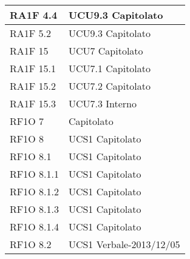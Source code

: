 \begin{center}
\begin{longtable}{ | p{5cm} | p{5cm} |}
        RA1F 4.4 &  UCU9.3 \newline  Capitolato \newline  \\ \hline      
        RA1F 5.2 &  UCU9.3 \newline  Capitolato \newline  \\ \hline      
        RA1F 15 &  UCU7 \newline  Capitolato \newline  \\ \hline      
        RA1F 15.1 &  UCU7.1 \newline  Capitolato \newline  \\ \hline      
        RA1F 15.2 &  UCU7.2 \newline  Capitolato \newline  \\ \hline      
        RA1F 15.3 &  UCU7.3 \newline  Interno \newline  \\ \hline      
        RF1O 7 &  Capitolato \newline  \\ \hline      
        RF1O 8  &  UCS1 \newline  Capitolato \newline  \\ \hline      
        RF1O 8.1  &  UCS1 \newline  Capitolato \newline  \\ \hline      
        RF1O 8.1.1  &  UCS1 \newline  Capitolato \newline  \\ \hline      
        RF1O 8.1.2 &  UCS1 \newline  Capitolato \newline  \\ \hline      
        RF1O 8.1.3  &  UCS1 \newline  Capitolato \newline  \\ \hline      
        RF1O 8.1.4  &  UCS1 \newline  Capitolato \newline  \\ \hline      
        RF1O 8.2  &  UCS1 \newline  Verbale-2013/12/05 \newline  \\ \hline      

\end{longtable}
\end{center}

